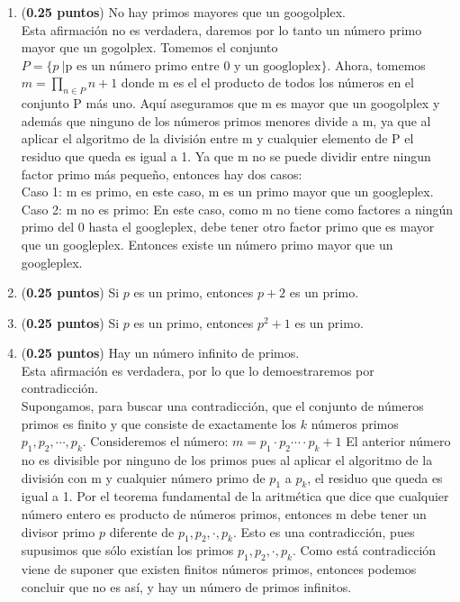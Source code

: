 \documentclass[fontsize=12pt]{scrartcl}
\begin{document}
\begin{enumerate}
		\item ({\bf 0.25 puntos})
		 No hay primos mayores que un googolplex. \\
                 Esta afirmación no es verdadera, daremos por lo tanto un número primo mayor que un gogolplex.
                 Tomemos el conjunto \\$P = \{p ~ | \text {p es un número primo entre 0 y un googloplex} \}$.
                 Ahora, tomemos
                 $m =  \prod_{n \in P} n  + 1$ donde m es el el producto de todos los números en el conjunto P más uno.
                 Aquí aseguramos que m es mayor que un googolplex y además que ninguno de los números primos menores divide a m, ya que al aplicar el algoritmo de la división entre m y cualquier elemento de P el residuo que queda es igual a 1. Ya que m no se puede dividir entre ningun factor primo más pequeño, entonces hay dos casos: \\
                 Caso 1:
                 m es primo, en este caso, m es un primo mayor que un googleplex.
                 Caso 2: m no es primo:
                 En este caso, como m no tiene como factores a ningún primo del 0 hasta el googleplex, debe tener otro factor primo que es mayor que un googleplex.
                Entonces existe un número primo mayor que un googleplex.
		
		\item ({\bf 0.25 puntos})
		Si $p$ es un primo, entonces $ p + 2 $ es un primo.
		
		\item ({\bf 0.25 puntos})
		Si $ p $ es un primo, entonces $ p^{2} + 1 $ es un primo.

		\item ({\bf 0.25 puntos})
		Hay un n\'umero infinito de primos. \\
	        Esta afirmación es verdadera, por lo que lo demoestraremos por contradicción. \\
                Supongamos, para buscar una contradicción, que el conjunto de números primos es finito y que consiste de exactamente los $k$ números primos $p_1, p_2, \cdots, p_k$. Consideremos el número: $m = p_1 \cdot p_2 \cdots \cdot p_k + 1$
El anterior número no es divisible por ninguno de los primos
pues  al aplicar el algoritmo de la división con m y cualquier número primo de $p_1 $ a $p_k$, el residuo que queda es igual a 1. Por el teorema fundamental de la aritmética que dice que cualquier número entero es producto de números primos, entonces m debe tener un divisor primo $p$ diferente de $p_1, p_2, \cdot, p_k$. Esto es una contradicción, pues supusimos que sólo existían los primos $p_1, p_2, \cdot, p_k$. Como está contradicción viene de suponer que existen finitos números primos, entonces podemos concluir que no es así, y hay un número de primos infinitos.


\end{enumerate}
\end{document}
